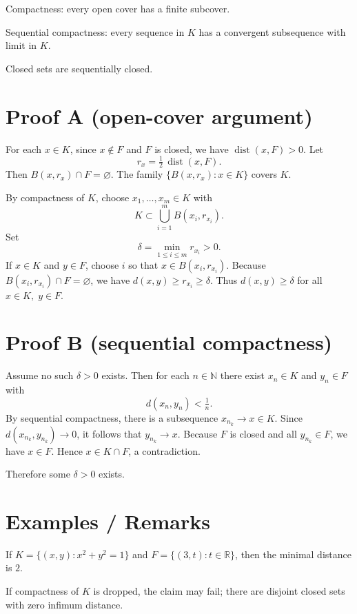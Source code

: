 \documentclass[12pt,a4paper]{article}
\theoremstyle{plain}
\theoremstyle{definition}
\theoremstyle{remark}
\theoremstyle{remark}
\begin{document}
Compactness: every open cover has a finite subcover.

Sequential compactness: every sequence in \(K\) has a convergent subsequence with limit in \(K\).

Closed sets are sequentially closed.

\bigskip

\section*{Proof A (open-cover argument)}

For each \(x\in K\), since \(x\notin F\) and \(F\) is closed, we have \(\operatorname{dist}(x,F)>0\).
Let
\[
r_x=\tfrac12\,\operatorname{dist}(x,F).
\]
Then \(B(x,r_x)\cap F=\varnothing\).
The family \(\{B(x,r_x):x\in K\}\) covers \(K\).

By compactness of \(K\), choose \(x_1,\dots,x_m\in K\) with
\[
K\subset \bigcup_{i=1}^{m} B(x_i,r_{x_i}).
\]
Set
\[
\delta=\min_{1\le i\le m} r_{x_i}>0.
\]
If \(x\in K\) and \(y\in F\), choose \(i\) so that \(x\in B(x_i,r_{x_i})\).
Because \(B(x_i,r_{x_i})\cap F=\varnothing\), we have \(d(x,y)\ge r_{x_i}\ge\delta\).
Thus \(d(x,y)\ge\delta\) for all \(x\in K,\; y\in F\).

\bigskip

\section*{Proof B (sequential compactness)}

Assume no such \(\delta>0\) exists.
Then for each \(n\in\mathbb{N}\) there exist \(x_n\in K\) and \(y_n\in F\) with
\[
d(x_n,y_n)<\tfrac{1}{n}.
\]
By sequential compactness, there is a subsequence \(x_{n_k}\to x\in K\).
Since \(d(x_{n_k},y_{n_k})\to 0\), it follows that \(y_{n_k}\to x\).
Because \(F\) is closed and all \(y_{n_k}\in F\), we have \(x\in F\).
Hence \(x\in K\cap F\), a contradiction.

Therefore some \(\delta>0\) exists.

\bigskip

\section*{Examples / Remarks}

If \(K=\{(x,y):x^2+y^2=1\}\) and \(F=\{(3,t):t\in\mathbb{R}\}\), then the minimal distance is \(2\).

If compactness of \(K\) is dropped, the claim may fail; there are disjoint closed sets with zero infimum distance.
\end{document}
